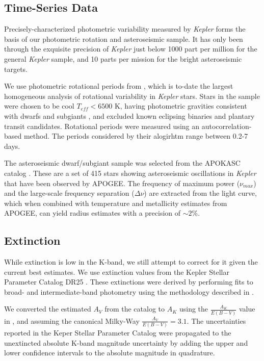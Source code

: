 \documentclass[manuscript]{aastex6}
\newcommand{\Kepler}{\mbox{\textit{Kepler}}}
\newcommand{\Teff}{\ensuremath{T_{eff}}}
\begin{document}
\subsection{Time-Series Data}

Precisely-characterized photometric variability measured by \Kepler{} forms the
basis of our photometric rotation and asteroseismic sample. It has only been
through the exquisite precision of \Kepler{} just below 1000 part per million for
the general \Kepler{} sample, and 10 parts per mission for the bright
asteroseismic targets.

We use photometric rotational periods from \citet{McQuillan14}, which is
to-date the largest homogeneous analysis of rotational variability in
\Kepler{} stars. Stars in the \citep{McQuillan14} sample were chosen to be cool
\(\Teff < 6500\) K, having photometric gravities consistent with dwarfs and
subgiants \citet{Brown11}, and excluded known eclipsing binaries and plantary
transit candidates. Rotational periods were measured using an
autocorrelation-based method. The periods considered by their alogirhtm range
between 0.2-7 days.

The asteroseismic dwarf/subgiant sample was selected from the APOKASC catalog
\citet{Serenelli17}. These are a set of 415 stars showing asteroseismic
oscillations in \Kepler{} that have been observed by APOGEE\@. The frequency 
of maximum power (\(\nu_{max}\)) and the large-scale frequency separation
(\(\Delta\nu\)) are extracted from the light curve, which when combined with
temperature and metallicity estimates from APOGEE, can yield radius estimates
with a precision of \(\sim 2\)\%. 

\subsection{Extinction}

While extinction is low in the K-band, we still attempt to correct for it given
the current best estimates. We use extinction values from the Kepler Stellar
Parameter Catalog DR25 \citep{Mathur17}. These extinctions were derived by
performing fits to broad- and intermediate-band photometry using the
methodology described in \citet{Huber14}.

We converted the estimated \(A_V\) from the catalog to \(A_K\) using the
\(\frac{A_K}{E(B-V)}\) value in \citet{Cardelli89}, and assuming the
canonical Milky-Way \(\frac{A_V}{E(B-V)} = 3.1\). The uncertainties reported in
the Keper Stellar Parameter Catalog were propagated to the unextincted absolute
K-band magnitude uncertainty by adding the upper and lower confidence intervals
to the absolute magnitude in quadrature.
\end{document}
